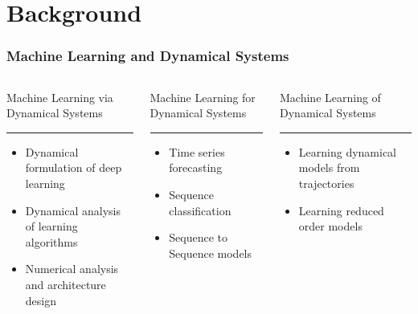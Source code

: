 \section{Background}

\begin{frame}
    \frametitle{Machine Learning and Dynamical Systems}

    \begin{columns}[T] %
        \begin{column}{.33\textwidth}
            {
                \color{nusblue}
                Machine Learning via Dynamical Systems
                \rule{\linewidth}{4pt}
            }
            \begin{itemize}
                \item Dynamical formulation of deep learning
                \item Dynamical analysis of learning algorithms
                \item Numerical analysis and architecture design
            \end{itemize}
        \end{column}%
        \hfill%
        \begin{column}{.33\textwidth}
            {
                \color{nusgreen}
                Machine Learning for Dynamical Systems
                \rule{\linewidth}{4pt}
            }
            \begin{itemize}
                \item Time series forecasting
                \item Sequence classification
                \item Sequence to Sequence models
            \end{itemize}
        \end{column}%
        \hfill%
        \begin{column}{.33\textwidth}
            {
                \color{nusorange}
                Machine Learning of Dynamical Systems
                \rule{\linewidth}{4pt}
            }
            \begin{itemize}
                \item Learning dynamical models from trajectories
                \item Learning reduced order models
            \end{itemize}
        \end{column}%
    \end{columns}
\end{frame}



